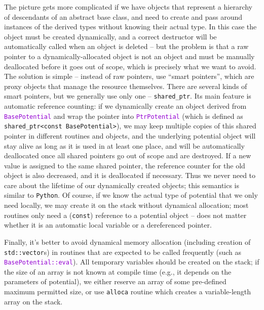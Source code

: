 \documentclass[12pt]{article}
\newcommand{\Python}{\texttt{Python}\xspace}
\newcommand{\ttt}[1]{\textcolor{darkviolet}{\texttt{#1}}}
\begin{document}
\label{sec:SmartPointers}
The picture gets more complicated if we have objects that represent a hierarchy of descendants of an abstract base class, and need to create and pass around instances of the derived types without knowing their actual type. In this case the object must be created dynamically, and a correct destructor will be automatically called when an object is deleted -- but the problem is that a raw pointer to a dynamically-allocated object is not an object and must be manually deallocated before it goes out of scope, which is precisely what we want to avoid. The solution is simple -- instead of raw pointers, use ``smart pointers'', which are proxy objects that manage the resource themselves. There are several kinds of smart pointers, but we generally use only one -- \texttt{shared_ptr}. Its main feature is automatic reference counting: if we dynamically create an object derived from \ttt{BasePotential} and wrap the pointer into \ttt{PtrPotential} (which is defined as \texttt{shared_ptr<const BasePotential>}), we may keep multiple copies of this shared pointer in different routines and objects, and the underlying potential object will stay alive as long as it is used in at least one place, and will be automatically deallocated once all shared pointers go out of scope and are destroyed. If a new value is assigned to the same shared pointer, the reference counter for the old object is also decreased, and it is deallocated if necessary. Thus we never need to care about the lifetime of our dynamically created objects; this semantics is similar to \Python.
Of course, if we know the actual type of potential that we only need locally, we may create it on the stack without dynamical allocation; most routines only need a (\texttt{const}) reference to a potential object -- does not matter whether it is an automatic local variable or a dereferenced pointer.

Finally, it's better to avoid dynamical memory allocation (including creation of \texttt{std::vector}s) in routines that are expected to be called frequently (such as \ttt{BasePotential::eval}). All temporary variables should be created on the stack; if the size of an array is not known at compile time (e.g., it depends on the parameters of potential), we either reserve an array of some pre-defined maximum permitted size, or use \texttt{alloca} routine which creates a variable-length array on the stack.
\end{document}
